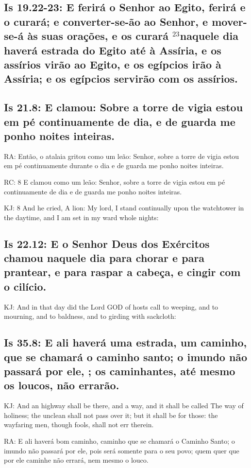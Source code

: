 \subsection{Is 19.22-23: E ferirá o Senhor ao Egito, ferirá e o curará; e converter-se-ão ao Senhor, e mover-se-á às suas orações, e os curará\uwave{;} $^{\mathrm{23}}$naquele dia haverá estrada do Egito até à Assíria, e os assírios virão ao Egito, e os egípcios irão à Assíria; e os egípcios servirão com os assírios.}

\subsection{Is 21.8: E clamou:  Sobre a torre de vigia estou em pé continuamente de dia, e de guarda me ponho noites inteiras.}

RA: Então, o atalaia gritou como um leão: Senhor, sobre a torre de vigia estou em pé continuamente durante o dia e de guarda me ponho noites inteiras.

RC: 8  E clamou como um leão: Senhor, sobre a torre de vigia estou em pé continuamente de dia e de guarda me ponho noites inteiras.

KJ: 8  And he cried, A lion: My lord, I stand continually upon the watchtower in the daytime, and I am set in my ward whole nights:

\subsection{Is 22.12: E o Senhor Deus dos Exércitos\uwave{,} chamou naquele dia para chorar e para prantear, e para raspar a cabeça, e cingir com o cilício.}

KJ: And in that day did the Lord GOD of hosts call to weeping, and to mourning, and to baldness, and to girding with sackcloth:

\subsection{Is 35.8: E ali haverá uma estrada, um caminho, que se chamará o caminho santo; o imundo não passará por ele, ; os caminhantes, até mesmo os loucos, não errarão.}

KJ: And an highway shall be there, and a way, and it shall be called The way of holiness; the unclean shall not pass over it; but it shall be for those: the wayfaring men, though fools, shall not err therein.

RA: E ali haverá bom caminho, caminho que se chamará o Caminho Santo; o imundo não passará por ele, pois será somente para o seu povo; quem quer que por ele caminhe não errará, nem mesmo o louco.

